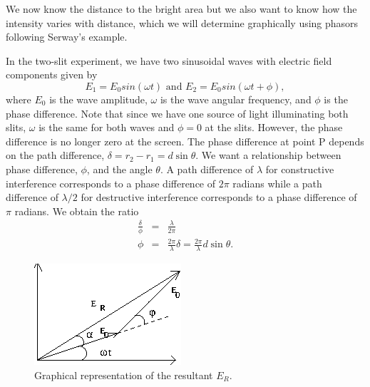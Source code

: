 We now know the distance to the bright area but we also want to know
how the intensity varies with distance, which we will determine
graphically using phasors following Serway's example.

In the two-slit experiment, we have two sinusoidal waves with 
electric field components given by
\begin{equation}
E_1 = E_0 sin(\omega t) \mbox{ and }E_2 = E_0 sin(\omega t + \phi),
\label{eqn:diff:E1E2}
\end{equation}
where $E_0$ is the wave amplitude, $\omega$ is the wave angular frequency,
and $\phi$ is the phase difference.  Note that since we have one source of 
light illuminating both slits, $\omega$ is the same for both waves and $\phi=0$
at the slits. However, the phase difference is no longer zero at the
screen.  The phase difference at point P depends on the path difference,
$\delta = r_2 - r_1 = d\sin \theta$.  We want a relationship between phase
difference, $\phi$, and the angle $\theta$.  A path difference of $\lambda$
for constructive interference corresponds to a phase difference of $2\pi$
radians while a path difference of $\lambda /2$ for destructive interference 
corresponds to a phase difference of $\pi$ radians.  We obtain the ratio
\begin{eqnarray}
\frac{\delta}{\phi} &=& \frac{\lambda}{2 \pi} \nonumber \\
\phi &=& \frac{2 \pi}{\lambda} \delta = \frac{2 \pi}{\lambda} d \sin \theta. 
\label{eqn:diff:phase difference}
\end{eqnarray}

\begin{figure}[htb]
\centering 
\epsfxsize=4cm \includegraphics[scale=0.6]{10_diffraction/2E.eps}
\caption{Graphical representation of the resultant $E_R$.} 
\label{fig:diff:2E}
\end{figure}

